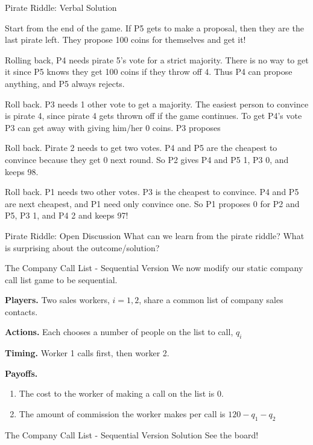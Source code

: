 \documentclass[aspectratio=169,usenames,dvipsnames]{beamer}
\newenvironment{wideitemize}{\itemize\addtolength{\itemsep}{10pt}}{\enditemize}
\begin{document}
\begin{frame}{Pirate Riddle: Verbal Solution}

\begin{wideitemize}
    \item Start from the end of the game. If P5 gets to make a proposal, then they are the last pirate left. They propose 100 coins for themselves and get it!\pause
    \item Rolling back, P4 needs pirate 5's vote for a strict majority. There is no way to get it since P5 knows they get 100 coins if they throw off 4. Thus P4 can propose anything, and P5 always rejects.\pause
    \item Roll back. P3 needs 1 other vote to get a majority. The easiest person to convince is pirate 4, since pirate 4 gets thrown off if the game continues. To get P4's vote P3 can get away with giving him/her 0 coins. P3 proposes\pause
    \item Roll back. Pirate 2 needs to get two votes. P4 and P5 are the cheapest to convince because they get 0 next round. So P2 gives P4 and P5 1, P3 0, and keeps 98.\pause
    \item Roll back. P1 needs two other votes. P3 is the cheapest to convince. P4 and P5 are next cheapest, and P1 need only convince one. So P1 proposes 0 for P2 and P5, P3 1, and P4 2 and keeps 97!
\end{wideitemize}
\end{frame}

\begin{frame}{Pirate Riddle: Open Discussion}
\centering
    \huge What can we learn from the pirate riddle? What is surprising about the outcome/solution?
\end{frame}

\begin{frame}{The Company Call List - Sequential Version}
We now modify our static company call list game to be sequential.
\begin{wideitemize}
    \item \textbf{Players.} Two sales workers, $i=1,2$, share a common list of company sales contacts.
    \item \textbf{Actions.} Each chooses a number of people on the list to call, $q_i$
    \item \textbf{Timing.} Worker 1 calls first, then worker 2.
    \item \textbf{Payoffs.} 
    \begin{enumerate}
        \item The cost to the worker of making a call on the list is 0.
        \item The amount of commission the worker makes per call is $120-q_1-q_2$
    \end{enumerate}
\end{wideitemize}


\end{frame}

\begin{frame}{The Company Call List - Sequential Version Solution}
\centering
    \huge See the board!
\end{frame}
\end{document}
